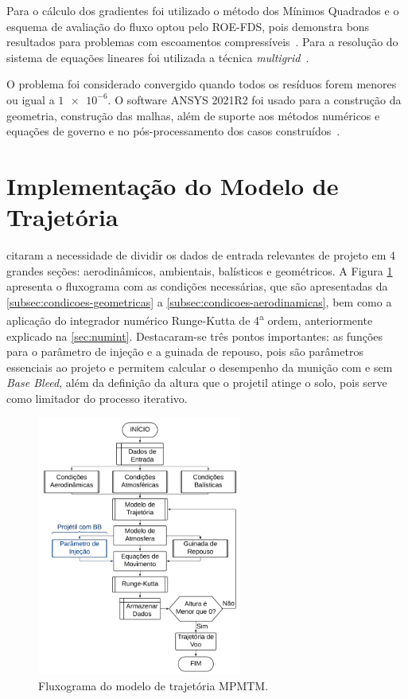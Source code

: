 Para o cálculo dos gradientes foi utilizado o método dos Mínimos Quadrados e o esquema de avaliação do fluxo optou pelo ROE-FDS, pois demonstra bons resultados para problemas com escoamentos compressíveis~\cite{nicolas-perez_accuracy_2017}. Para a resolução do sistema de equações lineares foi utilizada a técnica \textit{multigrid}~\cite{Hutchinson1986}.

O problema foi considerado convergido quando todos os resíduos forem menores ou igual a \(\num{1e-6}\). O software ANSYS 2021R2 foi usado para a construção da geometria, construção das malhas, além de suporte aos métodos numéricos e equações de governo e no pós-processamento dos casos construídos~\cite{fluent2021ansys}.

\section{Implementação do Modelo de Trajetória}\label{subsec:implementacao-trajetoria}

\cite{Rosendo2020} citaram a necessidade de dividir os dados de entrada relevantes de projeto em 4 grandes seções: aerodinâmicos, ambientais, balísticos e geométricos. A Figura \ref{fig:fluxograma-mpmtm} apresenta o fluxograma com as condições necessárias, que são apresentadas da \autoref{subsec:condicoes-geometricas} a \autoref{subsec:condicoes-aerodinamicas}, bem como a aplicação do integrador numérico Runge-Kutta de 4\textsuperscript{a} ordem, anteriormente explicado na \autoref{sec:numint}. Destacaram-se três pontos importantes: as funções para o parâmetro de injeção e a guinada de repouso, pois são parâmetros essenciais ao projeto e permitem calcular o desempenho da munição com e sem \textit{Base Bleed}, além da definição da altura que o projetil atinge o solo, pois serve como limitador do processo iterativo. 

\begin{figure}[!ht]
	\centering
	\includegraphics[width=0.6\textwidth]{foto03-fluxograma-mpmtm.png}
	\caption{\label{fig:fluxograma-mpmtm} Fluxograma do modelo de trajetória MPMTM.}
\end{figure}

